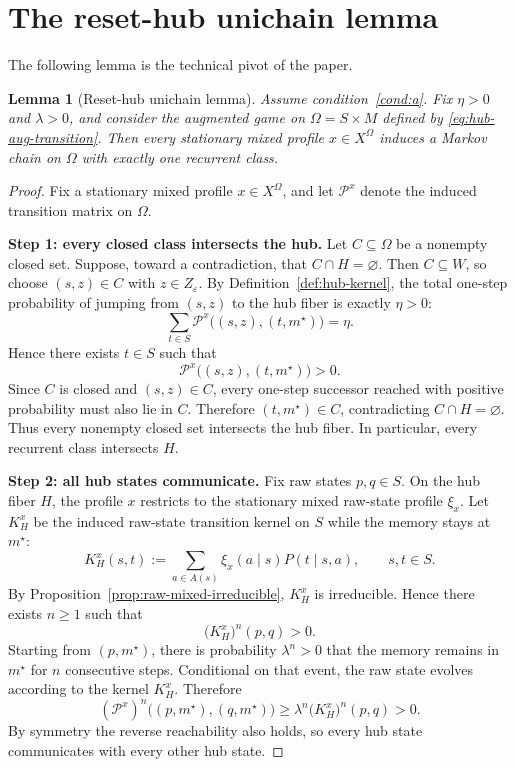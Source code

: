 \documentclass[11pt]{article}
\newtheorem{lemma}[theorem]{Lemma}
\theoremstyle{definition}
\newcommand{\1}{\mathbf{1}}
\begin{document}
\section{The reset-hub unichain lemma}\label{sec:hub-lemma}

The following lemma is the technical pivot of the paper.

\begin{lemma}[Reset-hub unichain lemma]\label{lem:hub-unichain}
Assume condition~\ref{cond:a}. Fix $\eta>0$ and $\lambda>0$, and consider the augmented game on $\Omega=S\times M$ defined by \eqref{eq:hub-aug-transition}. Then every stationary mixed profile $x\in X^\Omega$ induces a Markov chain on $\Omega$ with exactly one recurrent class.
\end{lemma}

\begin{proof}
Fix a stationary mixed profile $x\in X^\Omega$, and let $\mathcal P^x$ denote the induced transition matrix on $\Omega$.

\smallskip
\noindent
\textbf{Step 1: every closed class intersects the hub.}
Let $C\subseteq\Omega$ be a nonempty closed set. Suppose, toward a contradiction, that $C\cap H=\varnothing$. Then $C\subseteq W$, so choose $(s,z)\in C$ with $z\in Z_\varepsilon$. By Definition~\ref{def:hub-kernel}, the total one-step probability of jumping from $(s,z)$ to the hub fiber is exactly $\eta>0$:
\[
\sum_{t\in S}\mathcal P^x\bigl((s,z),(t,m^\star)\bigr)=\eta.
\]
Hence there exists $t\in S$ such that
\[
\mathcal P^x\bigl((s,z),(t,m^\star)\bigr)>0.
\]
Since $C$ is closed and $(s,z)\in C$, every one-step successor reached with positive probability must also lie in $C$. Therefore $(t,m^\star)\in C$, contradicting $C\cap H=\varnothing$. Thus every nonempty closed set intersects the hub fiber. In particular, every recurrent class intersects $H$.

\smallskip
\noindent
\textbf{Step 2: all hub states communicate.}
Fix raw states $p,q\in S$. On the hub fiber $H$, the profile $x$ restricts to the stationary mixed raw-state profile $\xi_x$. Let $K_H^x$ be the induced raw-state transition kernel on $S$ while the memory stays at $m^\star$:
\[
K_H^x(s,t)
:=\sum_{a\in A(s)}\xi_x(a\mid s)P(t\mid s,a),
\qquad s,t\in S.
\]
By Proposition~\ref{prop:raw-mixed-irreducible}, $K_H^x$ is irreducible. Hence there exists $n\ge1$ such that
\[
\bigl(K_H^x\bigr)^n(p,q)>0.
\]
Starting from $(p,m^\star)$, there is probability $\lambda^n>0$ that the memory remains in $m^\star$ for $n$ consecutive steps. Conditional on that event, the raw state evolves according to the kernel $K_H^x$. Therefore
\[
(\mathcal P^x)^n\bigl((p,m^\star),(q,m^\star)\bigr)
\ge \lambda^n\bigl(K_H^x\bigr)^n(p,q)
>
0.
\]
By symmetry the reverse reachability also holds, so every hub state communicates with every other hub state.


\end{proof}
\end{document}
